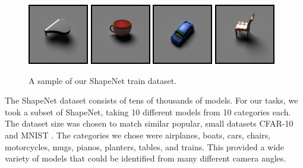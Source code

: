 \documentclass[10pt,twocolumn,letterpaper]{article}
\begin{document}
\begin{figure}[h!]
\centering
\includegraphics[width=0.24\columnwidth]{./assets/piano.jpg}
\includegraphics[width=0.24\columnwidth]{./assets/mug.jpg}
\includegraphics[width=0.24\columnwidth]{./assets/car.jpg}
\includegraphics[width=0.24\columnwidth]{./assets/chair.jpg}
\caption{A sample of our ShapeNet train dataset.}
\label{fig:SHAPENET}
\end{figure}

  The ShapeNet dataset consists of tens of thousands of models. For our tasks, we took a subset of ShapeNet, taking 10 different models from 10 categories each. The dataset size was chosen to match similar popular, small datasets CFAR-10 \cite{Krizhevsky09learningmultiple} and MNIST \cite{726791}. The categories we chose were airplanes, boats, cars, chairs, motorcycles, mugs, pianos, planters, tables, and trains. This provided a wide variety of models that could be identified from many different camera angles. 
\end{document}
